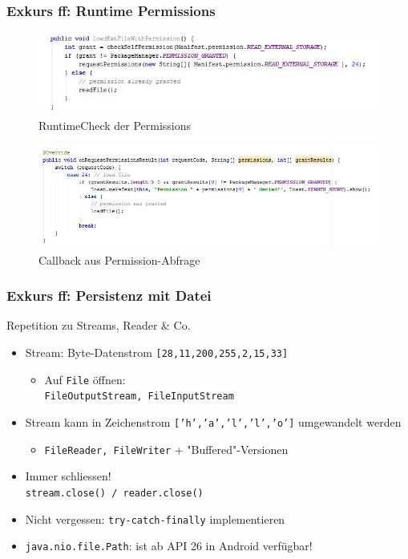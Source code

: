 \documentclass[a4paper]{article}
\begin{document}
\newpage

	\subsubsection{Exkurs ff: Runtime Permissions}
	
	\begin{figure}[htb!]
		\centering
		\includegraphics[width=.9\textwidth]{img/runtimeperm1.jpg}
		\caption{RuntimeCheck der Permissions}
	\end{figure}
	
	\begin{figure}[htb!]
		\centering
		\includegraphics[width=.9\textwidth]{img/runtimeperm2.jpg}
		\caption{Callback aus Permission-Abfrage}
	\end{figure}
	
	\subsubsection{Exkurs ff: Persistenz mit Datei}
	
	Repetition zu Streams, Reader \& Co.
	
	\begin{itemize}
		\item Stream: Byte-Datenstrom \texttt{[28,11,200,255,2,15,33]}
			\begin{itemize}
				\item Auf \texttt{File} öffnen:\\
				\texttt{FileOutputStream, FileInputStream}
			\end{itemize}
		\item Stream kann in Zeichenstrom \texttt{['h','a','l','l','o']} umgewandelt werden
			\begin{itemize}
				\item \texttt{FileReader, FileWriter} + "Buffered"-Versionen
			\end{itemize}
		\item Immer schliessen!\\
		\texttt{stream.close() / reader.close()}
		\item Nicht vergessen: \texttt{try-catch-finally} implementieren
		\item \texttt{java.nio.file.Path}: ist ab API 26 in Android verfügbar!
	\end{itemize}
\end{document}
